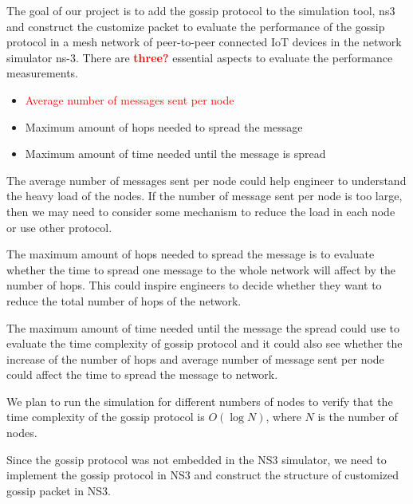 \documentclass[12pt,journal]{IEEEtran}
\begin{document}
The goal of our project is to add the gossip protocol to the simulation tool, ns3 and construct the customize packet to evaluate the performance of the gossip protocol in a mesh network of peer-to-peer connected IoT devices in the network simulator ns-3. There are \textcolor{red}{\textbf{three?}} essential aspects to evaluate the performance measurements.
\begin{itemize}
 \item \textcolor{red}{ Average number of messages sent per node}
 \item Maximum amount of hops needed to spread the message
 \item Maximum amount of time needed until the message is spread
\end{itemize}

The average number of messages sent per node could help engineer to understand the heavy load of the nodes. If the number of message sent per node is too large, then we may need to consider some mechanism to reduce the load in each node or use other protocol.

The maximum amount of hops needed to spread the message is to evaluate whether the time to spread one message to the whole network will affect by the number of hops. This could inspire engineers to decide whether they want to reduce the total number of hops of the network.

The maximum amount of time needed until the message the spread could use to evaluate the time complexity of gossip protocol and it could also see whether the increase of the number of hops and average number of message sent per node could affect the time to spread the message to network.

We plan to run the simulation for different numbers of nodes to verify that the time complexity of the gossip protocol is $O(\log N)$, where $N$ is the number of nodes.

Since the gossip protocol was not embedded in the NS3 simulator, we need to implement the gossip protocol in NS3 and construct the structure of customized gossip packet in NS3.
\end{document}
